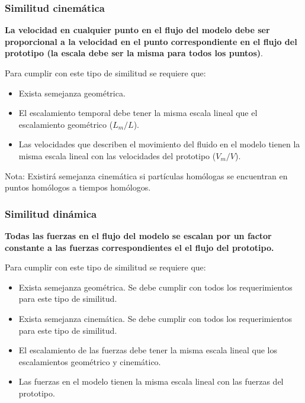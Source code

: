 \documentclass[t]{beamer}
\begin{document}
\begin{frame}
\frametitle{Similitud cinemática}

  \textbf{La velocidad en cualquier punto en el flujo del modelo debe ser
proporcional a la velocidad en el punto correspondiente en el flujo del
prototipo (la escala debe ser la misma para todos los puntos)}. 

\vspace{0.2cm} 

Para
cumplir con este tipo de similitud se requiere que:

    \begin{itemize}
\item
  Exista semejanza geométrica. 
\item
  El escalamiento temporal debe tener la misma escala lineal que el
  escalamiento geométrico (\(L_m/L\)). 
\item
  Las velocidades que describen el movimiento del fluido en el modelo
  tienen la misma escala lineal con las velocidades del prototipo
  (\(V_m/V\)).
\end{itemize}

Nota: Existirá semejanza cinemática si partículas homólogas se
encuentran en puntos homólogos a tiempos homólogos.
\end{frame}
\begin{frame}
\frametitle{Similitud dinámica}

    \textbf{Todas las fuerzas en el flujo del modelo se escalan por un factor
constante a las fuerzas correspondientes el el flujo del prototipo.}

\vspace{0.2cm}

 Para cumplir con este tipo de similitud se requiere que:

    \begin{itemize}
\item
  Exista semejanza geométrica. Se debe cumplir con todos los
  requerimientos para este tipo de similitud.
\item
  Exista semejanza cinemática. Se debe cumplir con todos los
  requerimientos para este tipo de similitud.
\item
  El escalamiento de las fuerzas debe tener la misma escala lineal que
  los escalamientos geométrico y cinemático. 
\item
  Las fuerzas en el modelo tienen la misma escala lineal con las fuerzas
  del prototipo.
\end{itemize}
\end{frame}
\end{document}
